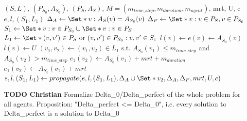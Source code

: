 \documentclass{article}
\begin{document}
\begin{algorithm}
	\caption{$Delta_{perfect}$} \label{algo:Deltaperfect}
	\begin{algorithmic}[1]
		\Require $(S,L)$, $(P_{S_0},A_{S_0})$, $(P_S,A_S)$, $M=(m_{time\_step},m_{duration},m_{agent})$, mrt, U, c
	    \Ensure $e,l,(S_1,L_1)$
	    \State $\Delta_A \leftarrow \Set*{v: A_S(v)=A_{S_0}(v)}$
	    \State $\Delta_P \leftarrow \Set*{v: v\in P_S, v\in P_{S_0}}$
	    \State $S_1 \leftarrow \Set*{v: v\in P_{S_0}} \cup \Set*{v: v\in P_{S}}$
	    \State $L_1 \leftarrow \Set*{(v,v^\prime) \in P_S \textrm{ or } (v,v^\prime) \in P_{S_0}: v,v^\prime \in S_1}$
	        \State $l(v)\leftarrow e(v)\leftarrow A_{S_0}(v)$
	    \EndFor
	        \State $l(v) \leftarrow U$
	    \EndFor
	    \State $(v_1,v_2) \leftarrow (v_1,v_2) \in L_1$ s.t. $A_{S_0}(v_1)\leq m_{time\_step}$ and $A_{S_0}(v_2)>m_{time\_step}$
            \State $e_1(v_2) \leftarrow A_{S_0}(v_1)+mrt+m_{duration}$
        \Else
            \State $e_1(v_2) \leftarrow A_{S_0}(v_1)+mrt$
        \EndIf
        \EndIf
	    \State $e,l,(S_1,L_1) \leftarrow propagate(e,l,(S_1,L_1),\Delta_A \cup \Set*{v_2}, \Delta_A, \Delta_P, mrt, U, c)$
	\end{algorithmic}
\end{algorithm}

\begin{mdframed}
{\bf TODO Christian}
Formalize Delta\_0/Delta\_perfect of the whole problem for all agents.
Proposition: "Delta\_perfect <= Delta\_0", i.e. every solution to Delta\_perfect is a solution to Delta\_0
\end{mdframed}
\end{document}
